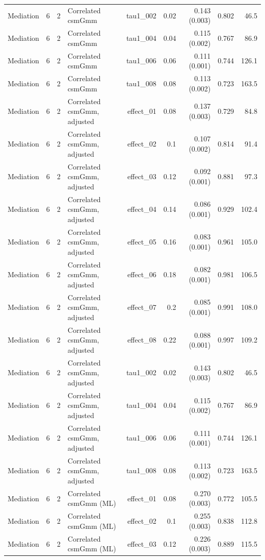 \begin{longtable}{lcclrrrrr}
Mediation & 6 & 2 & Correlated csmGmm & tau1\_002 & 0.02 & 0.143 (0.003) & 0.802 & 46.5\\
Mediation & 6 & 2 & Correlated csmGmm & tau1\_004 & 0.04 & 0.115 (0.002) & 0.767 & 86.9\\
Mediation & 6 & 2 & Correlated csmGmm & tau1\_006 & 0.06 & 0.111 (0.001) & 0.744 & 126.1\\
Mediation & 6 & 2 & Correlated csmGmm & tau1\_008 & 0.08 & 0.113 (0.002) & 0.723 & 163.5\\
Mediation & 6 & 2 & Correlated csmGmm, adjusted & effect\_01 & 0.08 & 0.137 (0.003) & 0.729 & 84.8\\
Mediation & 6 & 2 & Correlated csmGmm, adjusted & effect\_02 & 0.1 & 0.107 (0.002) & 0.814 & 91.4\\
Mediation & 6 & 2 & Correlated csmGmm, adjusted & effect\_03 & 0.12 & 0.092 (0.001) & 0.881 & 97.3\\
Mediation & 6 & 2 & Correlated csmGmm, adjusted & effect\_04 & 0.14 & 0.086 (0.001) & 0.929 & 102.4\\
Mediation & 6 & 2 & Correlated csmGmm, adjusted & effect\_05 & 0.16 & 0.083 (0.001) & 0.961 & 105.0\\
Mediation & 6 & 2 & Correlated csmGmm, adjusted & effect\_06 & 0.18 & 0.082 (0.001) & 0.981 & 106.5\\
Mediation & 6 & 2 & Correlated csmGmm, adjusted & effect\_07 & 0.2 & 0.085 (0.001) & 0.991 & 108.0\\
Mediation & 6 & 2 & Correlated csmGmm, adjusted & effect\_08 & 0.22 & 0.088 (0.001) & 0.997 & 109.2\\
Mediation & 6 & 2 & Correlated csmGmm, adjusted & tau1\_002 & 0.02 & 0.143 (0.003) & 0.802 & 46.5\\
Mediation & 6 & 2 & Correlated csmGmm, adjusted & tau1\_004 & 0.04 & 0.115 (0.002) & 0.767 & 86.9\\
Mediation & 6 & 2 & Correlated csmGmm, adjusted & tau1\_006 & 0.06 & 0.111 (0.001) & 0.744 & 126.1\\
Mediation & 6 & 2 & Correlated csmGmm, adjusted & tau1\_008 & 0.08 & 0.113 (0.002) & 0.723 & 163.5\\
Mediation & 6 & 2 & Correlated csmGmm (ML) & effect\_01 & 0.08 & 0.270 (0.003) & 0.772 & 105.5\\
Mediation & 6 & 2 & Correlated csmGmm (ML) & effect\_02 & 0.1 & 0.255 (0.003) & 0.838 & 112.8\\
Mediation & 6 & 2 & Correlated csmGmm (ML) & effect\_03 & 0.12 & 0.226 (0.003) & 0.889 & 115.5\\

\end{longtable}
